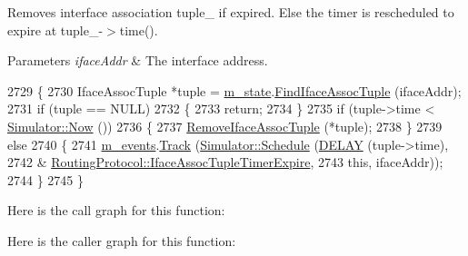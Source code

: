 Removes interface association tuple\+\_\+ if expired. Else the timer is rescheduled to expire at tuple\+\_\+-\/$>$time(). 


\begin{DoxyParams}{Parameters}
{\em iface\+Addr} & The interface address. \\
\hline
\end{DoxyParams}

\begin{DoxyCode}
2729 \{
2730   IfaceAssocTuple *tuple = \hyperlink{classns3_1_1olsr_1_1RoutingProtocol_a07942ec1a7df71b609c8d2ff3b567c49}{m\_state}.\hyperlink{classns3_1_1olsr_1_1OlsrState_a35a68caeae507605f294290967216d50}{FindIfaceAssocTuple} (ifaceAddr);
2731   \textcolor{keywordflow}{if} (tuple == NULL)
2732     \{
2733       \textcolor{keywordflow}{return};
2734     \}
2735   \textcolor{keywordflow}{if} (tuple->time < \hyperlink{classns3_1_1Simulator_ac3178fa975b419f7875e7105be122800}{Simulator::Now} ())
2736     \{
2737       \hyperlink{classns3_1_1olsr_1_1RoutingProtocol_a8ecb5343f7e51de7be585b06dbb1b721}{RemoveIfaceAssocTuple} (*tuple);
2738     \}
2739   \textcolor{keywordflow}{else}
2740     \{
2741       \hyperlink{classns3_1_1olsr_1_1RoutingProtocol_a80368d3da46150cf3fc9139c40f33d53}{m\_events}.\hyperlink{classns3_1_1EventGarbageCollector_a4f26a1f6e9a09e648eb31b46acd85144}{Track} (\hyperlink{classns3_1_1Simulator_a671882c894a08af4a5e91181bf1eec13}{Simulator::Schedule} (\hyperlink{olsr-routing-protocol_8cc_ad0a00c3386c4a24278b3b710ae798220}{DELAY} (tuple->time),
2742                                            &
      \hyperlink{classns3_1_1olsr_1_1RoutingProtocol_af93aa9d349c1be0aef8401d2e4189d4c}{RoutingProtocol::IfaceAssocTupleTimerExpire},
2743                                            \textcolor{keyword}{this}, ifaceAddr));
2744     \}
2745 \}
\end{DoxyCode}


Here is the call graph for this function\+:




Here is the caller graph for this function\+:



